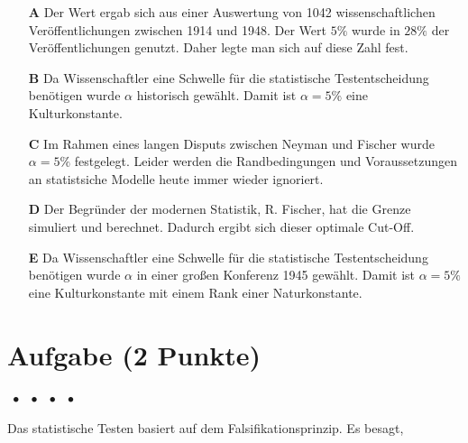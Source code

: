 \documentclass[a4paper, 9pt]{scrartcl}\usepackage[]{graphicx}\usepackage[]{xcolor}
\begin{document}
\begin{enumerate}
\item [\textbf{A} \msquare] Der Wert ergab sich aus einer Auswertung von 1042 wissenschaftlichen Veröffentlichungen zwischen 1914 und 1948. Der Wert $5\%$ wurde in $28\%$ der Veröffentlichungen genutzt. Daher legte man sich auf diese Zahl fest.
\item [\textbf{B} \msquare] Da Wissenschaftler eine Schwelle für die statistische Testentscheidung benötigen wurde $\alpha$ historisch gewählt. Damit ist $\alpha = 5\%$ eine Kulturkonstante.
\item [\textbf{C} \msquare] Im Rahmen eines langen Disputs zwischen Neyman und Fischer wurde $\alpha = 5\%$ festgelegt. Leider werden die Randbedingungen und Voraussetzungen an statistsiche Modelle heute immer wieder ignoriert.
\item [\textbf{D} \msquare] Der Begründer der modernen Statistik, R. Fischer, hat die Grenze simuliert und berechnet. Dadurch ergibt sich dieser optimale Cut-Off.
\item [\textbf{E} \msquare] Da Wissenschaftler eine Schwelle für die statistische Testentscheidung benötigen wurde $\alpha$ in einer großen Konferenz 1945 gewählt. Damit ist $\alpha = 5\%$ eine Kulturkonstante mit einem Rank einer Naturkonstante.
\end{enumerate} 

\section{Aufgabe \hfill (2 Punkte)}

\ifcollection
\begin{flushright}
\tiny\vspace{-2Ex}
\textbf{\examinhaltstart}
\exammodulemathstat $\;\bullet$
\exammodulestat $\;\bullet$
\exammodulestatbbv $\;\bullet$
\exammodulestatversuch $\;\bullet$
\exammodulebiostat
\vspace{-1Ex}
\end{flushright}
\fi




Das statistische Testen basiert auf dem Falsifikationsprinzip. Es besagt,
\end{document}
